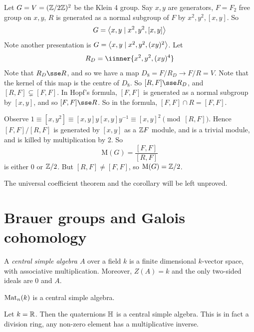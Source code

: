 \documentclass{article}
\begin{document}
\begin{example}
    Let \(G = V = (\mathbb{Z}/2\mathbb{Z})^2\) be the Klein 4 group. Say \(x, y\) are generators, \(F = F_2\) free group on \(x, y\), \(R\) is generated as a normal subgroup of \(F\) by \(x^2, y^2, [x,y]\). So
    \[G = \left\langle x, y \mid x^2, y^2, [x, y] \right\rangle\]
    Note another presentation is \(G = \left\langle x, y \mid x^2, y^2, (xy)^2 \right\rangle\). Let
    \[R_D = \iinner{x^2, y^2, (xy)^4}\]
    Note that \(R_D \sse R\), and so we have a map \(D_8 = F/R_D \to F/R = V\). Note that the kernel of this map is the centre of \(D_8\). So \([R, F] \sse R_D\), and \([R, F] \subsetneq [F, F]\). In Hopf's formula, \([F, F]\) is generated as a normal subgroup by \([x, y]\), and so \([F, F] \sse R\). So in the formula, \([F, F] \cap R = [F, F]\).
    
    Observe \(1 \equiv [x, y^2] \equiv [x, y]y[x, y]y^{-1} \equiv [x, y]^2 \pmod{[R, F]}\). Hence \([F, F]/[R, F]\) is generated by \([x, y]\) as a \(\mathbb{Z} F\) module, and is a trivial module, and is killed by multiplication by 2. So 
    \[\mathrm{M}(G) = \frac{[F, F]}{[R, F]}\]
    is either \(0\) or \(\mathbb{Z}/2\). But \([R, F] \ne [F, F]\), so \(\mathrm{M}(G) = \mathbb{Z}/2\).
\end{example}

\begin{remark}
    The universal coefficient theorem and the corollary will be left unproved.
\end{remark}

\section{Brauer groups and Galois cohomology}

\begin{definition}
    A \emph{central simple algebra \(A\)} over a field \(k\) is a finite dimensional \(k\)-vector space, with associative multiplication. Moreover, \(Z(A) = k\) and the only two-sided ideals are \(0\) and \(A\). 
\end{definition}

\begin{example}
    \(\operatorname{Mat}_n(k)\) is a central simple algebra.
\end{example}

\begin{example}
    Let \(k = \mathbb{R}\). Then the quaternions \(\mathbb{H}\) is a central simple algebra. This is in fact a division ring, any non-zero element has a multiplicative inverse.
\end{example}
\end{document}
